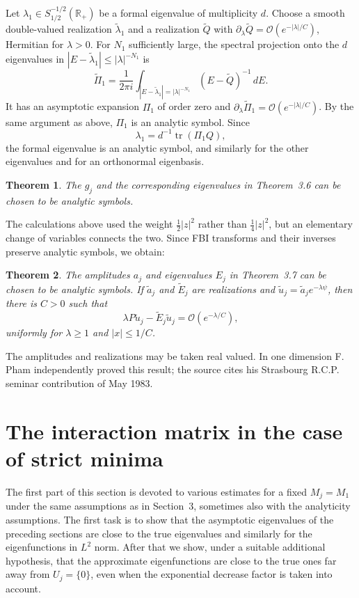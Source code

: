 \documentclass[11pt,a4paper]{article}
\newcommand{\R}{\mathbb R}
\newcommand{\cO}{\mathcal O}
\numberwithin{equation}{section}
\newtheorem{theorem}{Theorem}[section]
\theoremstyle{remark}
\begin{document}
Let $\lambda_1\in S_{1/2}^{-1/2}(\R_+)$ be a formal eigenvalue of multiplicity $d$. Choose a smooth double-valued realization $\widetilde\lambda_1$ and a realization $\widetilde Q$ with $\partial_\lambda\widetilde Q=\cO(e^{-|\lambda|/C})$, Hermitian for $\lambda>0$. For $N_1$ sufficiently large, the spectral projection onto the $d$ eigenvalues in
$|E-\widetilde\lambda_1|\le|\lambda|^{-N_1}$ is
\[
\widetilde\Pi_1=\frac1{2\pi i}
\int_{|E-\widetilde\lambda_1|=|\lambda|^{-N_1}}
(E-\widetilde Q)^{-1}\,dE.
\]
It has an asymptotic expansion $\Pi_1$ of order zero and $\partial_\lambda\widetilde\Pi_1=\cO(e^{-|\lambda|/C})$. By the same argument as above, $\Pi_1$ is an analytic symbol. Since
\[
\lambda_1=d^{-1}\operatorname{tr}(\Pi_1Q),
\]
the formal eigenvalue is an analytic symbol, and similarly for the other eigenvalues and for an orthonormal eigenbasis.

\begin{theorem}
The $g_j$ and the corresponding eigenvalues in Theorem~3.6 can be chosen to be analytic symbols.
\end{theorem}

The calculations above used the weight $\frac12|z|^2$ rather than $\frac14|z|^2$, but an elementary change of variables connects the two. Since FBI transforms and their inverses preserve analytic symbols, we obtain:

\begin{theorem}
The amplitudes $a_j$ and eigenvalues $E_j$ in Theorem~3.7 can be chosen to be analytic symbols. If $\widetilde a_j$ and $\widetilde E_j$ are realizations and $\widetilde u_j=\widetilde a_je^{-\lambda\psi}$, then there is $C>0$ such that
\begin{equation}
\lambda P\widetilde u_j-\widetilde E_j\widetilde u_j
=\cO(e^{-\lambda/C}),
\end{equation}
uniformly for $\lambda\ge1$ and $|x|\le1/C$.
\end{theorem}
The amplitudes and realizations may be taken real valued. In one dimension F. Pham independently proved this result; the source cites his Strasbourg R.C.P. seminar contribution of May 1983.


\section{The interaction matrix in the case of strict minima}
The first part of this section is devoted to various estimates for a fixed $M_j=M_1$ under the same assumptions as in Section~3, sometimes also with the analyticity assumptions. The first task is to show that the asymptotic eigenvalues of the preceding sections are close to the true eigenvalues and similarly for the eigenfunctions in $L^2$ norm. After that we show, under a suitable additional hypothesis, that the approximate eigenfunctions are close to the true ones far away from $U_j=\{0\}$, even when the exponential decrease factor is taken into account.
\end{document}
